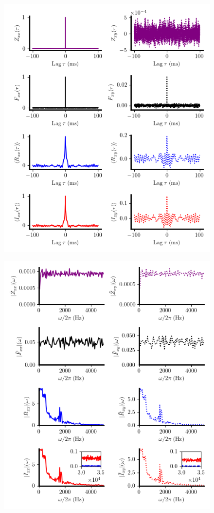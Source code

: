 \documentclass{ucetd}
\begin{document}
\begin{figure}[t!]
\centering
\includegraphics[width=140mm]{figure-4}
\caption{}
\end{figure}

\begin{figure}[t!]
\centering
\includegraphics[width=140mm]{figure-5}
\caption{}
\end{figure}
\end{document}
